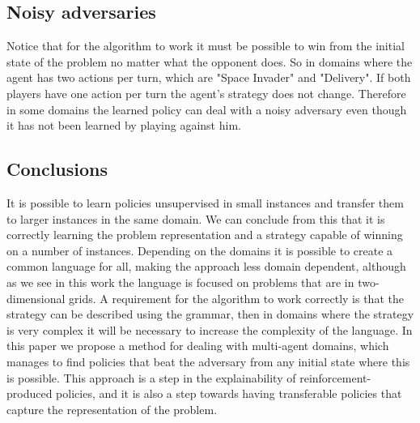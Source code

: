 \documentclass[a4paper]{article}
\begin{document}



\subsection{Noisy adversaries}

Notice that for the algorithm to work it must be possible to win from the initial state of the problem no matter what the opponent does. So in domains where the agent has two actions per turn, which are "Space Invader" and "Delivery". If both players have one action per turn the agent's strategy does not change. Therefore in some domains the learned policy can deal with a noisy adversary even though it has not been learned by playing against him.

\subsection{Conclusions}

It is possible to learn policies unsupervised in small instances and transfer them to larger instances in the same domain. We can conclude from this that it is correctly learning the problem representation and a strategy capable of winning on a number of instances. Depending on the domains it is possible to create a common language for all, making the approach less domain dependent, although as we see in this work the language is focused on problems that are in two-dimensional grids. A requirement for the algorithm to work correctly is that the strategy can be described using the grammar, then in domains where the strategy is very complex it will be necessary to increase the complexity of the language. In this paper we propose a method for dealing with multi-agent domains, which manages to find policies that beat the adversary from any initial state where this is possible. This approach is a step in the explainability of reinforcement-produced policies, and it is also a step towards having transferable policies that capture the representation of the problem.
\end{document}

